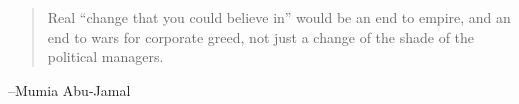 \documentclass[letterpaper, landscape]{exam}
\begin{document}
  \else
    \vspace{10 cm}
    \begin{quote}
      \begin{em}
        Real ``change that you could believe in'' would be an end to empire,
        and an end to wars for corporate greed, not just a change of the shade
        of the political managers.
      \end{em}
    \end{quote}
    \hspace{2 cm} --Mumia Abu-Jamal
  \fi
\end{document}
